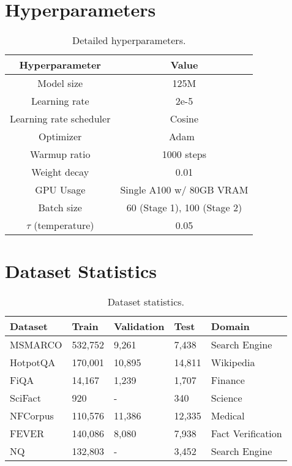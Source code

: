 \section{Hyperparameters}\label{appendix:hyperparameters}
\begin{table}[h!]
    \centering
    \begin{adjustbox}{width=.6\textwidth,center}
    \begin{tabular}{|c|c|}
        \hline
        \textbf{Hyperparameter} & \textbf{Value}  \\
        \hline
        Model size & 125M \\
        Learning rate & 2e-5 \\
        Learning rate scheduler & Cosine \\
        Optimizer & Adam~\cite{kingma2014adam} \\
        Warmup ratio & 1000 steps \\
        Weight decay & 0.01 \\
        GPU Usage & Single A100 w/ 80GB VRAM \\
        Batch size & 60 (Stage 1), 100 (Stage 2) \\
        $\tau$ (temperature) & 0.05 \\
       \hline
    \end{tabular}
    \end{adjustbox}
    \caption{Detailed hyperparameters.} 
    \label{tab:hyper}
\end{table}

\section{Dataset Statistics}\label{appendix:dataset}
\begin{table}[h!]
\begin{adjustbox}{width=.7\textwidth,center}
\begin{tabular}{|l|l|l|l|l|}
\hline
\textbf{Dataset} & \textbf{Train} & \textbf{Validation} & \textbf{Test} & \textbf{Domain} \\ \hline
MSMARCO         &         532,752       &          9,261          &     7,438         &  Search Engine  \\
HotpotQA         &       170,001         &     10,895               &         14,811     &  Wikipedia  \\
FiQA             &        14,167        &     1,239                &        1,707      & Finance \\
SciFact          &         920       &        -             &       340      &    Science  \\
NFCorpus         &       110,576         &    11,386                 &       12,335    & Medical    \\
FEVER         &       140,086         &    8,080                 &       7,938    & Fact Verification    \\
NQ         &       132,803         &    -                 &       3,452    & Search Engine    \\ \hline
\end{tabular}
\end{adjustbox}
\caption{Dataset statistics.}
\label{tab:dataset_statistics}
\end{table}